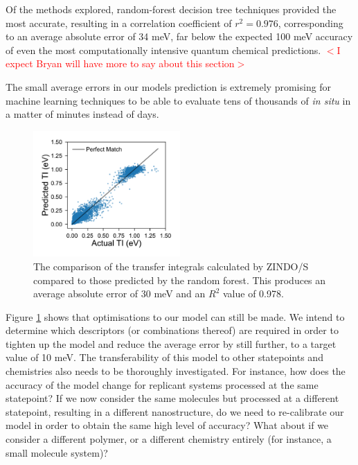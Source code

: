\documentclass[12pt]{article}
\begin{document}
Of the methods explored, random-forest decision tree techniques provided the most accurate, resulting in a correlation coefficient of $r^{2} = 0.976$, corresponding to an average absolute error of 34 meV, far below the expected 100 meV accuracy of even the most computationally intensive quantum chemical predictions.
\textcolor{red}{$<$I expect Bryan will have more to say about this section$>$}



The small average errors in our models prediction is extremely promising for machine learning techniques to be able to evaluate tens of thousands of \textit{in situ} in a matter of minutes instead of days.
\begin{figure}\centering
	\includegraphics[width=0.5\textwidth]{Figures/comparison.pdf}
    \caption{
The comparison of the transfer integrals calculated by ZINDO/S compared to those predicted by the random forest.
This produces an average absolute error of 30 meV and an $R^2$ value of 0.978.
}
	\label{fig:random_forest_results}
\end{figure}
Figure \ref{fig:random_forest_results} shows that optimisations to our model can still be made.
We intend to determine which descriptors (or combinations thereof) are required in order to tighten up the model and reduce the average error by still further, to a target value of 10 meV.
The transferability of this model to other statepoints and chemistries also needs to be thoroughly investigated.
For instance, how does the accuracy of the model change for replicant systems processed at the same statepoint?
If we now consider the same molecules but processed at a different statepoint, resulting in a different nanostructure, do we need to re-calibrate our model in order to obtain the same high level of accuracy?
What about if we consider a different polymer, or a different chemistry entirely (for instance, a small molecule system)?
\end{document}
